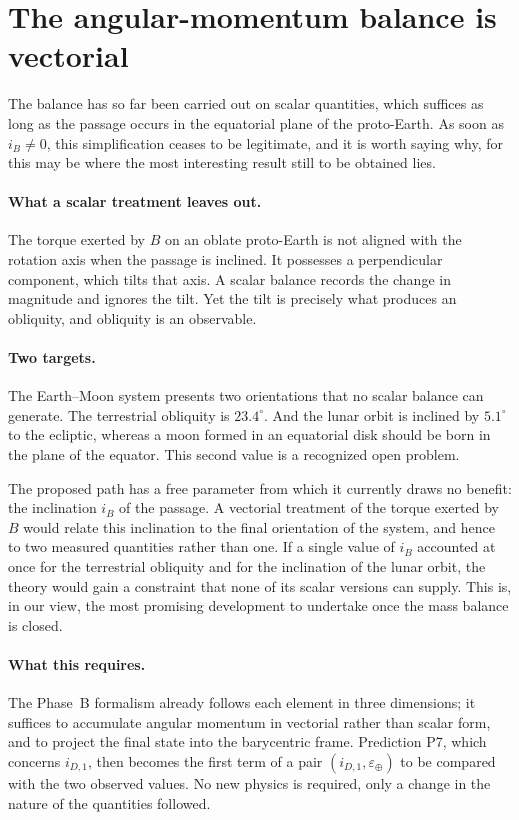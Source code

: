 \documentclass[11pt,a4paper,openany]{report}
\begin{document}
\section{The angular-momentum balance is vectorial}
\label{sec:vectoriel}

The balance has so far been carried out on scalar quantities, which suffices as long as the passage
occurs in the equatorial plane of the proto-Earth. As soon as $i_B\ne0$, this simplification ceases
to be legitimate, and it is worth saying why, for this may be where the most interesting result
still to be obtained lies.

\paragraph{What a scalar treatment leaves out.} The torque exerted by $B$ on an oblate proto-Earth
is not aligned with the rotation axis when the passage is inclined. It possesses a perpendicular
component, which tilts that axis. A scalar balance records the change in magnitude and ignores the
tilt. Yet the tilt is precisely what produces an obliquity, and obliquity is an observable.

\paragraph{Two targets.} The Earth--Moon system presents two orientations that no scalar balance
can generate. The terrestrial obliquity is $23.4^\circ$. And the lunar orbit is inclined by
$5.1^\circ$ to the ecliptic, whereas a moon formed in an equatorial disk should be born in the
plane of the equator. This second value is a recognized open problem.

\begin{ideephys}
The proposed path has a free parameter from which it currently draws no benefit: the inclination
$i_B$ of the passage. A vectorial treatment of the torque exerted by $B$ would relate this
inclination to the final orientation of the system, and hence to two measured quantities rather
than one. If a single value of $i_B$ accounted at once for the terrestrial obliquity and for the
inclination of the lunar orbit, the theory would gain a constraint that none of its scalar versions
can supply. This is, in our view, the most promising development to undertake once the mass balance
is closed.
\end{ideephys}

\paragraph{What this requires.} The Phase~B formalism already follows each element in three
dimensions; it suffices to accumulate angular momentum in vectorial rather than scalar form, and to
project the final state into the barycentric frame. Prediction P7, which concerns $i_{D,1}$, then
becomes the first term of a pair $(i_{D,1},\varepsilon_\oplus)$ to be compared with the two observed
values. No new physics is required, only a change in the nature of the quantities followed.
\end{document}
